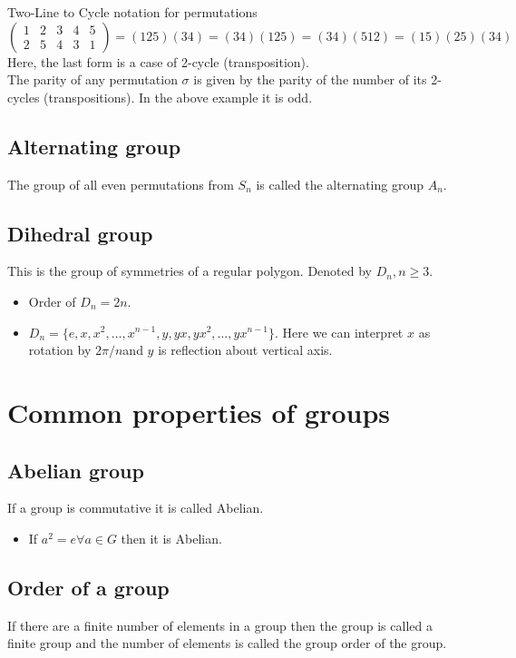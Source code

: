 \documentclass[oneside,11pt,pdftex]{book}%
\numberwithin{equation}{section}
\numberwithin{section}{chapter}
\numberwithin{equation}{chapter}
\begin{document}
Two-Line to Cycle notation for permutations
\[ \left(\begin{matrix}
	1 & 2 & 3 & 4 & 5\\ 
	2 & 5 & 4 & 3 & 1
\end{matrix}\right)=(125)(34)=(34)(125)=(34)(512)=(15)(25)(34) \]
Here, the last form is a case of 2-cycle (transposition).\\
The parity of any permutation $\sigma$ is given by the parity of the number of its 2-cycles (transpositions). In the above example it is odd.

\subsection{Alternating group}
The group of all even permutations from $ S_n $ is called the alternating group $ A_n $.

\subsection{Dihedral group}
This is the group of symmetries of a regular polygon. Denoted by $ D_n, n\geq 3$.
\begin{itemize}
	\item Order of $ D_n=2n $.
	\item $ D_n=\{e,x,x^2,\dots,x^{n-1},y,yx,yx^2,\dots,yx^{n-1}\} $. Here we can interpret $ x $ as rotation by $ 2\pi/n $and $ y $ is reflection about vertical axis.
\end{itemize}

\section{Common properties of groups}

\subsection{Abelian group}
If a group is commutative it is called Abelian. 
\begin{itemize}
	\item If $ a^2 =e \forall a \in G$ then it is Abelian.
\end{itemize}

\subsection{Order of a group}
If there are a finite number of elements in a group then the group is called a finite group and the number of elements is called the group order of the group.
\end{document}
